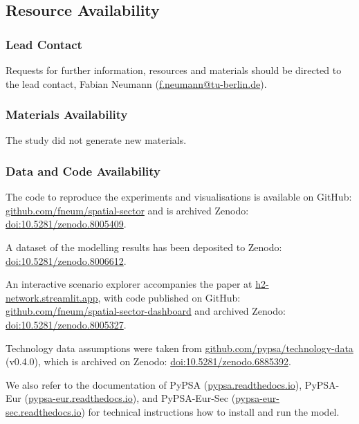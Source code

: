 \subsection*{Resource Availability}

\subsubsection*{Lead Contact}

Requests for further information, resources and materials should be directed to
the lead contact, Fabian Neumann
(\href{mailto:f.neumann@tu-berlin.de}{f.neumann@tu-berlin.de}).

\subsubsection*{Materials Availability}

The study did not generate new materials.

\subsubsection*{Data and Code Availability}

The code to reproduce the experiments and visualisations is available on GitHub:
\href{https://github.com/fneum/spatial-sector}{github.com/fneum/spatial-sector}
and is archived Zenodo: \href{https://doi.org/10.5281/zenodo.8005409}{doi:10.5281/zenodo.8005409}.

A dataset of the modelling results has been deposited to Zenodo:
\href{https://doi.org/10.5281/zenodo.8006612}{doi:10.5281/zenodo.8006612}.

An interactive scenario explorer accompanies the paper at
\href{https://h2-network.streamlit.app}{h2-network.streamlit.app}, with code published on GitHub:
\href{https://github.com/fneum/spatial-sector-dashboard}{github.com/fneum/spatial-sector-dashboard}
and archived Zenodo: \href{https://doi.org/10.5281/zenodo.8005327}{doi:10.5281/zenodo.8005327}.

Technology data assumptions were taken from
\href{https://github.com/pypsa/technology-data}{github.com/pypsa/technology-data}
(v0.4.0), which is archived on Zenodo: \href{https://doi.org/10.5281/zenodo.6885392}{doi:10.5281/zenodo.6885392}.

We also refer to the documentation of PyPSA
(\href{https://pypsa.readthedocs.io}{pypsa.readthedocs.io}), PyPSA-Eur
(\href{https://pypsa-eur.readthedocs.io}{pypsa-eur.readthedocs.io}), and
PyPSA-Eur-Sec
(\href{https://pypsa-eur-sec.readthedocs.io}{pypsa-eur-sec.readthedocs.io})
for technical instructions how to install and run the model.


